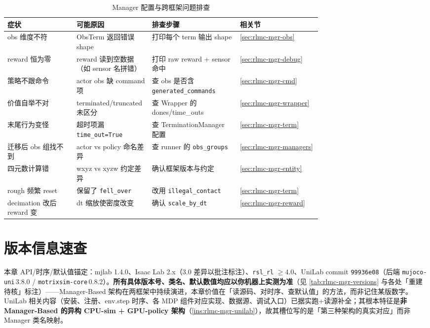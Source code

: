 \begin{table}[H]
\centering
\caption{Manager 配置与跨框架问题排查}
\label{tab:rlmc-mgr-faq}
\footnotesize
\begin{tabular}{@{}p{0.22\linewidth}p{0.24\linewidth}p{0.28\linewidth}l@{}}
\toprule
症状 & 可能原因 & 排查步骤 & 相关节 \\
\midrule
obs 维度不符 & ObsTerm 返回错误 shape & 打印每个 term 输出 shape & \cref{sec:rlmc-mgr-obs} \\
reward 恒为零 & reward 读到空数据（如 sensor 名拼错） & 打印 raw reward + sensor 命中 & \cref{sec:rlmc-mgr-debug} \\
策略不跟命令 & actor obs 缺 command 项 & 查 obs 是否含 \verb|generated_commands| & \cref{sec:rlmc-mgr-cmd} \\
价值自举不对 & terminated/truncated 未区分 & 查 Wrapper 的 dones/time\_outs & \cref{sec:rlmc-mgr-wrapper} \\
末尾行为变怪 & 超时项漏 \verb|time_out=True| & 查 TerminationManager 配置 & \cref{sec:rlmc-mgr-term} \\
迁移后 obs 组找不到 & actor vs policy 命名差异 & 查 runner 的 \verb|obs_groups| & \cref{sec:rlmc-mgr-managers} \\
四元数计算错 & wxyz vs xyzw 约定差异 & 确认框架版本与约定 & \cref{sec:rlmc-mgr-entity} \\
rough 频繁 reset & 保留了 \verb|fell_over| & 改用 \verb|illegal_contact| & \cref{sec:rlmc-mgr-term} \\
decimation 改后 reward 变 & dt 缩放使密度改变 & 确认 \verb|scale_by_dt| & \cref{sec:rlmc-mgr-reward} \\
\bottomrule
\end{tabular}
\end{table}

\section*{版本信息速查}
\label{sec:rlmc-mgr-versioninfo}

本章 API/时序/默认值锚定：mjlab 1.4.0、Isaac Lab 2.x（3.0 差异以批注标注）、\verb|rsl_rl| $\ge 4.0$、UniLab commit \texttt{99936e08}（后端 \texttt{mujoco-uni}\,3.8.0 / \texttt{motrixsim-core}\,0.8.2）。\textbf{所有具体版本号、类名、默认数值均应以你机器上实测为准}（见 \cref{tab:rlmc-mgr-versions} 与各处「重建待核」标注）——Manager-Based 架构在两框架中持续演进，本章价值在「读源码、对时序、查默认值」的方法，而非记住某版数字。UniLab 相关内容（安装、注册、env.step 时序、各 MDP 组件对应实现、数据源、调试入口）已据实跑+读源补全；其根本特征是\textbf{非 Manager-Based 的异构 CPU-sim + GPU-policy 架构}（\cref{ins:rlmc-mgr-unilab}），故其槽位写的是「第三种架构的真实对应」而非 Manager 类名映射。
